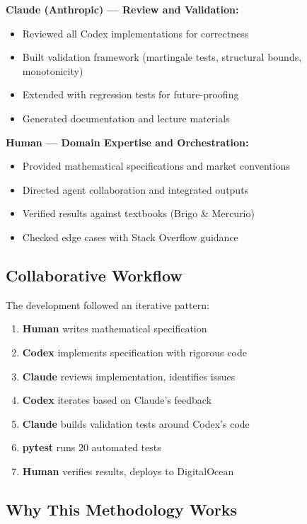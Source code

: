 \documentclass[10pt,a4paper]{article}
\begin{document}
\textbf{Claude (Anthropic) --- Review and Validation:}
\begin{itemize}
    \item Reviewed all Codex implementations for correctness
    \item Built validation framework (martingale tests, structural bounds, monotonicity)
    \item Extended with regression tests for future-proofing
    \item Generated documentation and lecture materials
\end{itemize}

\textbf{Human --- Domain Expertise and Orchestration:}
\begin{itemize}
    \item Provided mathematical specifications and market conventions
    \item Directed agent collaboration and integrated outputs
    \item Verified results against textbooks (Brigo \& Mercurio)
    \item Checked edge cases with Stack Overflow guidance
\end{itemize}

\subsection{Collaborative Workflow}

The development followed an iterative pattern:

\begin{enumerate}
    \item \textbf{Human} writes mathematical specification
    \item \textbf{Codex} implements specification with rigorous code
    \item \textbf{Claude} reviews implementation, identifies issues
    \item \textbf{Codex} iterates based on Claude's feedback
    \item \textbf{Claude} builds validation tests around Codex's code
    \item \textbf{pytest} runs 20 automated tests
    \item \textbf{Human} verifies results, deploys to DigitalOcean
\end{enumerate}

\subsection{Why This Methodology Works}
\end{document}
